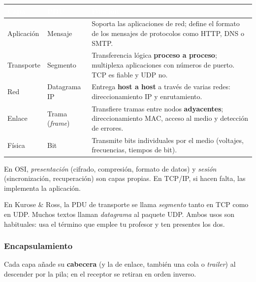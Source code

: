 \documentclass[11pt,a4paper]{article}
\newcommand{\hd}[1]{\cellcolor{uahblue}\textcolor{white}{\textbf{#1}}}
\begin{document}
\begin{tabularx}{\textwidth}{@{}L{2.8cm}L{3.2cm}X@{}}
\toprule
\hd{Capa} & \hd{PDU} & \hd{Función} \\
\midrule
Aplicación & Mensaje & Soporta las aplicaciones de red; define el formato de los mensajes de protocolos como HTTP, DNS o SMTP. \\
Transporte & Segmento & Transferencia lógica \textbf{proceso a proceso}; multiplexa aplicaciones con números de puerto. TCP es fiable y UDP no. \\
Red & Datagrama IP & Entrega \textbf{host a host} a través de varias redes: direccionamiento IP y enrutamiento. \\
Enlace & Trama (\emph{frame}) & Transfiere tramas entre nodos \textbf{adyacentes}; direccionamiento MAC, acceso al medio y detección de errores. \\
Física & Bit & Transmite bits individuales por el medio (voltajes, frecuencias, tiempos de bit). \\
\bottomrule
\end{tabularx}

\begin{nota}
En OSI, \emph{presentación} (cifrado, compresión, formato de datos) y \emph{sesión} (sincronización, recuperación) son capas propias. En TCP/IP, si hacen falta, las implementa la aplicación.
\end{nota}

\begin{nota}
En Kurose \& Ross, la PDU de transporte se llama \emph{segmento} tanto en TCP como en UDP. Muchos textos llaman \emph{datagrama} al paquete UDP. Ambos usos son habituales: usa el término que emplee tu profesor y ten presentes los dos.
\end{nota}

\subsubsection{Encapsulamiento}

Cada capa añade su \textbf{cabecera} (y la de enlace, también una cola o \emph{trailer}) al descender por la pila; en el receptor se retiran en orden inverso.
\end{document}

